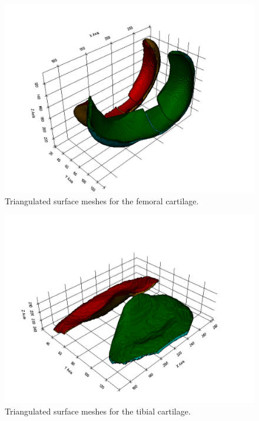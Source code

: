 \begin{figure}[]
	\centering
	\includegraphics[width=\linewidth]{./figures/femoral_meshes}
	\caption{Triangulated surface meshes for the femoral cartilage.}
	\label{fig:femoral_meshes}
\end{figure}
\begin{figure}[]
	\centering
	\includegraphics[width=\linewidth]{./figures/tibial_meshes}
	\caption{Triangulated surface meshes for the tibial cartilage.}
	\label{fig:tibial_meshes}
\end{figure}
